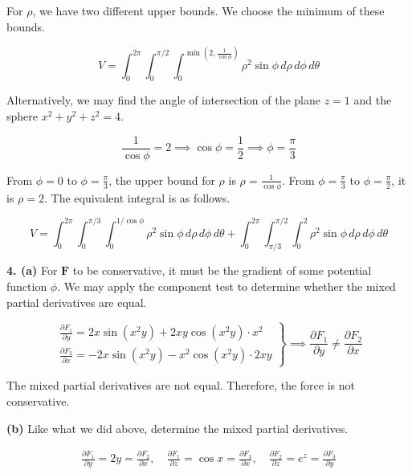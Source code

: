 \documentclass{article}
\begin{document}
For $\rho$, we have two different upper bounds. We choose the minimum of these bounds.

\[\boxed{V=\int_0^{2\pi}\int_{0}^{\pi/2}\int_0^{\min\left(2,\textstyle\frac1{\cos\phi}\right)}\rho^2\sin\phi\,d\rho\,d\phi\,d\theta}\]

Alternatively, we may find the angle of intersection of the plane $z=1$ and the sphere $x^2+y^2+z^2=4$.

\[\frac1{\cos\phi}=2\implies\cos\phi=\frac12\implies\phi=\frac\pi3\]

From $\phi=0$ to $\displaystyle\phi=\frac\pi3$, the upper bound for $\rho$ is $\displaystyle\rho=\frac1{\cos\phi}$. From $\displaystyle\phi=\frac\pi3$ to $\displaystyle\phi=\frac\pi2$, it is $\rho=2$. The equivalent integral is as follows.

\[\boxed{V=\int_0^{2\pi}\int_0^{\pi/3}\int_0^{1/\cos\phi}\rho^2\sin\phi\,d\rho\,d\phi\,d\theta+\int_0^{2\pi}\int_{\pi/3}^{\pi/2}\int_0^2\rho^2\sin\phi\,d\rho\,d\phi\,d\theta}\]

\vspace{1em}

\textbf{4. (a)} For $\mathbf{F}$ to be conservative, it must be the gradient of some potential function $\phi$. We may apply the component test to determine whether the mixed partial derivatives are equal.

\[
\left.
\begin{array}{l}
\displaystyle\frac{\partial{F}_1}{\partial y}=2x\sin\left(x^2y\right)+2xy\cos\left(x^2y\right)\cdot x^2\\[1em]
\displaystyle\frac{\partial{F}_2}{\partial x}=-2x\sin\left(x^2y\right)-x^2\cos\left(x^2y\right)\cdot 2xy
\end{array}\right\}\implies\displaystyle\frac{\partial{F}_1}{\partial y}\neq\displaystyle\frac{\partial{F}_2}{\partial x}
\]

The mixed partial derivatives are not equal. Therefore, the force is not conservative.

\textbf{(b)} Like what we did above, determine the mixed partial derivatives.

\[
\begin{array}{c}
\displaystyle\frac{\partial{F}_1}{\partial y}=2y=\frac{\partial{F}_2}{\partial x},\quad\frac{\partial{F}_1}{\partial z}=\cos x=\frac{\partial{F}_3}{\partial x},\quad\frac{\partial{F}_2}{\partial z}={e}^z=\frac{\partial{F}_3}{\partial y}
\end{array}
\]

\newpage
\end{document}
